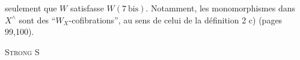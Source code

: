 
seulement que $W$ satisfasse  $W(7\ \mathrm{bis})$. Notamment, les monomorphismes dans $X^\wedge$ sont des ``$W_X$-cofibrations'', au sens   de celui de la définition 2 c) (pages 99,100).

\textsc{Strong}  \textsc{S}

